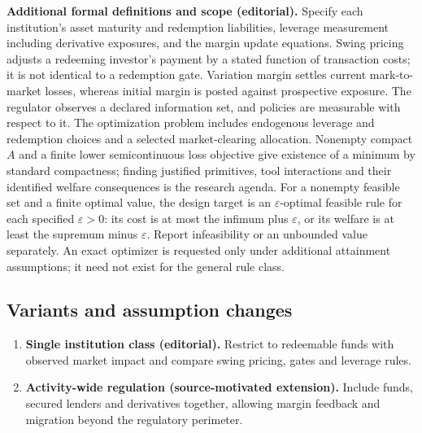\documentclass[11pt,a4paper]{article}
\begin{document}
\textbf{Additional formal definitions and scope (editorial).} Specify each institution's asset maturity and redemption liabilities, leverage measurement including derivative exposures, and the margin update equations. Swing pricing adjusts a redeeming investor's payment by a stated function of transaction costs; it is not identical to a redemption gate. Variation margin settles current mark-to-market losses, whereas initial margin is posted against prospective exposure. The regulator observes a declared information set, and policies are measurable with respect to it. The optimization problem includes endogenous leverage and redemption choices and a selected market-clearing allocation. Nonempty compact \(A\) and a finite lower semicontinuous loss objective give existence of a minimum by standard compactness; finding justified primitives, tool interactions and their identified welfare consequences is the research agenda. For a nonempty feasible set and a finite optimal value, the design target is an \(\varepsilon\)-optimal feasible rule for each specified \(\varepsilon>0\): its cost is at most the infimum plus \(\varepsilon\), or its welfare is at least the supremum minus \(\varepsilon\). Report infeasibility or an unbounded value separately. An exact optimizer is requested only under additional attainment assumptions; it need not exist for the general rule class.
\subsection*{Variants and assumption changes}
\begin{enumerate}
\item \textbf{Single institution class (editorial).} Restrict to redeemable funds with observed market impact and compare swing pricing, gates and leverage rules.
\item \textbf{Activity-wide regulation (source-motivated extension).} Include funds, secured lenders and derivatives together, allowing margin feedback and migration beyond the regulatory perimeter.
\end{enumerate}
\end{document}

